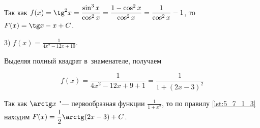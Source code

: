 Так как 
$\displaystyle f(x) = \tg^{2} x =
\frac{\sin^{3} x}{\cos^{2} x} = \frac{1 - \cos^{2} x}{\cos^{2} x} = 
\frac{1}{\cos^{2} x} - 1$,
то $F(x) = \tg x - x + C$.

3) $\displaystyle f(x) = \frac{1}{4x^{2} - 12x + 10 }$.

Выделяя полный квадрат в~знаменателе, получаем

\begin{equation*}
\displaystyle f(x) = \frac{1}{4x^{2} - 12x + 9 + 1} = \frac{1}{1 + (2x - 3)^{2}}
\end{equation*}

Так как $\arctg x$ "--- первообразная функции $\displaystyle \frac{1}{1 + x^{2}}$,
то по правилу \ref{lst:5_7_1_3} находим
$\displaystyle F(x) = \frac{1}{2} \arctg (2x - 3) + C$.

